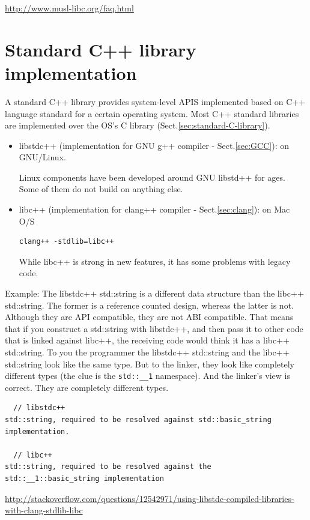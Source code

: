 \url{http://www.musl-libc.org/faq.html}

\section{Standard C++ library implementation}
\label{sec:standard-C++-library}
\label{sec:C++-standard-library}

A standard C++ library provides system-level APIS implemented based on C++
language standard for a certain operating system.
Most C++ standard libraries are implemented over the OS's C library
(Sect.\ref{sec:standard-C-library}).


\begin{itemize}
  
  \item libstdc++ (implementation for GNU g++ compiler - Sect.\ref{sec:GCC}):
  on GNU/Linux.

Linux components have been developed around GNU libstd++ for ages. Some of them
do not build on anything else.


  \item libc++ (implementation for clang++ compiler - Sect.\ref{sec:clang}): on
  Mac O/S
  
\begin{verbatim}
clang++ -stdlib=libc++
\end{verbatim}

While libc++ is strong in new features, it has some problems with legacy code.
\end{itemize}


Example:
The libstdc++ std::string is a different data structure than the libc++
std::string. The former is a reference counted design, whereas the latter is
not. Although they are API compatible, they are not ABI compatible. That means
that if you construct a std::string with libstdc++, and then pass it to other
code that is linked against libc++, the receiving code would think it has a
libc++ std::string.
To you the programmer the libstdc++ std::string and the libc++ std::string look
like the same type. But to the linker, they look like completely different types
(the clue is the \verb!std::__1! namespace). And the linker's view is correct.
They are completely different types.
\begin{verbatim}
  // libstdc++
std::string, required to be resolved against std::basic_string implementation.

  // libc++
std::string, required to be resolved against the std::__1::basic_string implementation
\end{verbatim}
\url{http://stackoverflow.com/questions/12542971/using-libstdc-compiled-libraries-with-clang-stdlib-libc}

